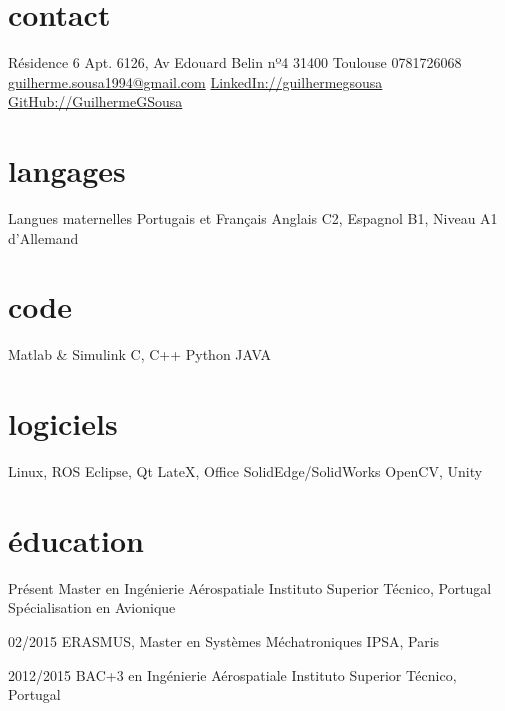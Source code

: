 \documentclass[a4paper]{friggeri-cv} %
\begin{document}


\begin{aside} %
\section{contact}
Résidence 6 Apt. 6126, Av Edouard Belin nº4
31400 Toulouse
0781726068
\href{mailto:guilherme.sousa1994@gmail.com}{guilherme.sousa1994\newline @gmail.com}
\href{https://www.linkedin.com/in/guilhermegsousa}{LinkedIn://guilhermegsousa}
\href{https://github.com/GuilhermeGSousa}{GitHub://GuilhermeGSousa}
\section{langages}
Langues maternelles Portugais et Français 
Anglais C2,
Espagnol B1,
Niveau A1 d'Allemand
\section{code}
Matlab \& Simulink
C, C++
Python
JAVA
\section{logiciels}
Linux, ROS
Eclipse, Qt
LateX, Office
SolidEdge/SolidWorks
OpenCV, Unity
\end{aside}


\section{éducation}

\begin{entrylist}


\entry
{Présent}
{Master {\normalfont en Ingénierie Aérospatiale}}
{Instituto Superior Técnico, Portugal}
{Spécialisation en Avionique}%


\entry
{02/2015}
{ERASMUS, Master {\normalfont en Systèmes Méchatroniques} }
{IPSA, Paris}
{}

\entry
{2012/2015}
{BAC+3 {\normalfont en Ingénierie Aérospatiale}}
{Instituto Superior Técnico, Portugal}
{}


\end{entrylist}
\end{document}
